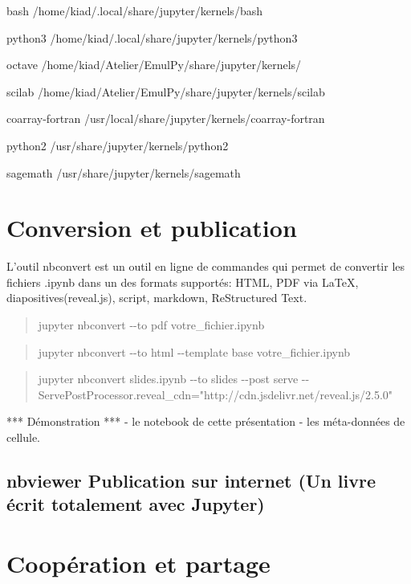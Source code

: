 \documentclass[11pt]{article}
\begin{document}
bash /home/kiad/.local/share/jupyter/kernels/bash

python3 /home/kiad/.local/share/jupyter/kernels/python3

octave /home/kiad/Atelier/EmulPy/share/jupyter/kernels/

scilab /home/kiad/Atelier/EmulPy/share/jupyter/kernels/scilab

coarray-fortran /usr/local/share/jupyter/kernels/coarray-fortran

python2 /usr/share/jupyter/kernels/python2

sagemath /usr/share/jupyter/kernels/sagemath

    \section{Conversion et publication}\label{conversion-et-publication}

L'outil nbconvert est un outil en ligne de commandes qui permet de
convertir les fichiers .ipynb dans un des formats supportés: HTML, PDF
via LaTeX, diapositives(reveal.js), script, markdown, ReStructured Text.

\begin{quote}
jupyter nbconvert -\/-to pdf votre\_fichier.ipynb
\end{quote}

\begin{quote}
jupyter nbconvert -\/-to html -\/-template base votre\_fichier.ipynb
\end{quote}

\begin{quote}
jupyter nbconvert slides.ipynb -\/-to slides -\/-post serve
-\/-ServePostProcessor.reveal\_cdn="http://cdn.jsdelivr.net/reveal.js/2.5.0"
\end{quote}

    *** Démonstration *** - le notebook de cette présentation - les
méta-données de cellule.

    \subsection{nbviewer Publication sur internet (Un livre écrit totalement
avec
Jupyter)}\label{nbviewer-publication-sur-internet-un-livre-uxe9crit-totalement-avec-jupyter}

    \section{Coopération et partage}\label{coopuxe9ration-et-partage}
\end{document}
